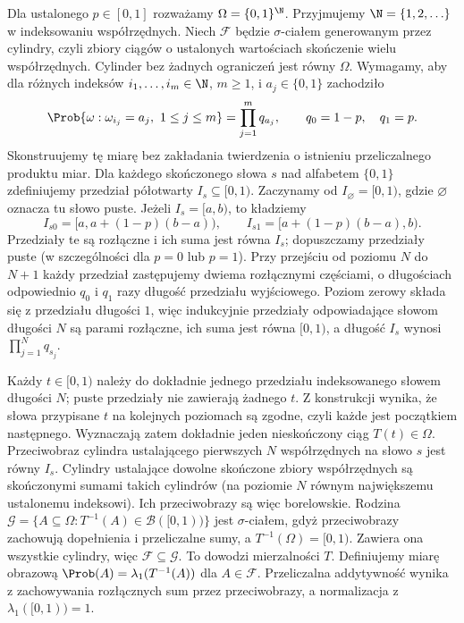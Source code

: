 \begin{przyklad}
Dla ustalonego $p\in[0,1]$ rozważamy $\Omega=\{0,1\}^{\N}$.
Przyjmujemy $\N=\{1,2,\ldots\}$ w indeksowaniu współrzędnych.
Niech $\mathcal F$ będzie $\sigma$-ciałem generowanym przez
cylindry, czyli zbiory ciągów o ustalonych wartościach skończenie
wielu współrzędnych. Cylinder bez żadnych ograniczeń jest
równy $\Omega$. Wymagamy, aby dla różnych indeksów
$i_1,\ldots,i_m\in\N$, $m\geq1$, i $a_j\in\{0,1\}$ zachodziło
\[
\Prob\{\omega:\omega_{i_j}=a_j,\ 1\leq j\leq m\}
=\prod_{j=1}^m q_{a_j},\qquad q_0=1-p,\quad q_1=p.
\]
Skonstruujemy tę miarę bez zakładania twierdzenia o istnieniu
przeliczalnego produktu miar. Dla każdego skończonego słowa
$s$ nad alfabetem $\{0,1\}$ zdefiniujemy przedział półotwarty
$I_s\subseteq[0,1)$. Zaczynamy od $I_{\varnothing}=[0,1)$,
gdzie $\varnothing$ oznacza tu słowo puste. Jeżeli $I_s=[a,b)$,
to kładziemy
\[
I_{s0}=[a,a+(1-p)(b-a)),\qquad
I_{s1}=[a+(1-p)(b-a),b).
\]
Przedziały te są rozłączne i ich suma jest równa $I_s$;
dopuszczamy przedziały puste (w szczególności dla $p=0$ lub $p=1$).
Przy przejściu od poziomu $N$ do $N+1$ każdy przedział
zastępujemy dwiema rozłącznymi częściami, o długościach
odpowiednio $q_0$ i $q_1$ razy długość przedziału wyjściowego.
Poziom zerowy składa się z przedziału długości $1$, więc
indukcyjnie przedziały odpowiadające słowom długości $N$
są parami rozłączne, ich suma jest równa $[0,1)$,
a długość $I_s$ wynosi $\prod_{j=1}^N q_{s_j}$.

Każdy $t\in[0,1)$ należy do dokładnie jednego przedziału
indeksowanego słowem długości $N$; puste przedziały nie
zawierają żadnego $t$. Z konstrukcji wynika, że słowa przypisane
$t$ na kolejnych poziomach są zgodne, czyli każde jest
początkiem następnego. Wyznaczają zatem dokładnie jeden
nieskończony ciąg $T(t)\in\Omega$. Przeciwobraz cylindra
ustalającego pierwszych $N$ współrzędnych na słowo $s$
jest równy $I_s$. Cylindry ustalające dowolne skończone
zbiory współrzędnych są skończonymi sumami takich cylindrów
(na poziomie $N$ równym największemu ustalonemu indeksowi).
Ich przeciwobrazy są więc borelowskie. Rodzina
$\mathcal G=\{A\subseteq\Omega:T^{-1}(A)\in\mathcal B([0,1))\}$
jest $\sigma$-ciałem, gdyż przeciwobrazy zachowują dopełnienia
i przeliczalne sumy, a $T^{-1}(\Omega)=[0,1)$. Zawiera ona
wszystkie cylindry, więc $\mathcal F\subseteq\mathcal G$.
To dowodzi mierzalności $T$. Definiujemy miarę obrazową
$\Prob(A)=\lambda_1(T^{-1}(A))$ dla $A\in\mathcal F$. Przeliczalna addytywność
wynika z zachowywania rozłącznych sum przez przeciwobrazy,
a normalizacja z $\lambda_1([0,1))=1$.


\end{przyklad}
